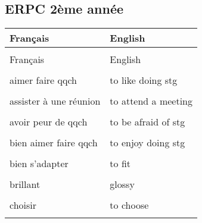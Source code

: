 \documentclass[
  10pt,
]{article}
\begin{document}
\hypertarget{erpc-2uxe8me-annuxe9e}{%
\subsection{ERPC 2ème année}\label{erpc-2uxe8me-annuxe9e}}

\begin{longtable}{ll}
\toprule
Français & \vphantom{1}English\\

\midrule
\cellcolor{gray!6}{ouvert d'esprit} & \cellcolor{gray!6}{open-minded}\\

Français & English\\
\cellcolor{gray!6}{PAO} & \cellcolor{gray!6}{Desktop Publishing (DTP)}\\

aimer faire qqch & to like doing stg\\

\cellcolor{gray!6}{ajouter} & \cellcolor{gray!6}{to add}\\

assister à une réunion & to attend a meeting\\

\cellcolor{gray!6}{attentionné} & \cellcolor{gray!6}{caring}\\

avoir peur de qqch & to be afraid of stg\\

\cellcolor{gray!6}{bavard} & \cellcolor{gray!6}{chatty}\\

bien aimer faire qqch & to enjoy doing stg\\

\cellcolor{gray!6}{bien conçu} & \cellcolor{gray!6}{well-designed}\\

bien s'adapter & to fit\\

\cellcolor{gray!6}{blanchir} & \cellcolor{gray!6}{to bleach}\\

brillant & glossy\\

\cellcolor{gray!6}{carton} & \cellcolor{gray!6}{cardboard (U)}\\

choisir & to choose\\

\cellcolor{gray!6}{commander qqch} & \cellcolor{gray!6}{to order stg}\\


\end{longtable}
\end{document}
